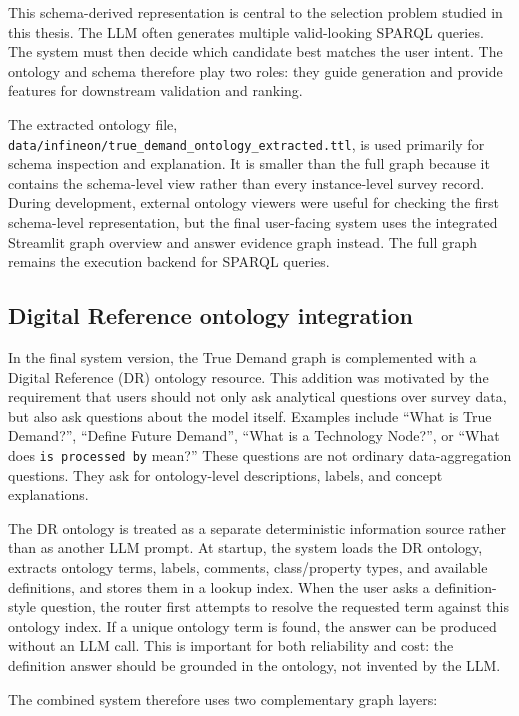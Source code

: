 \documentclass[
  12pt,
  english,
  oneside]{report}
\begin{document}
This schema-derived representation is central to the selection problem studied in this thesis. The LLM often generates multiple valid-looking SPARQL queries. The system must then decide which candidate best matches the user intent. The ontology and schema therefore play two roles: they guide generation and provide features for downstream validation and ranking.

The extracted ontology file, \texttt{data/infineon/true\_demand\_ontology\_extracted.ttl}, is used primarily for schema inspection and explanation. It is smaller than the full graph because it contains the schema-level view rather than every instance-level survey record. During development, external ontology viewers were useful for checking the first schema-level representation, but the final user-facing system uses the integrated Streamlit graph overview and answer evidence graph instead. The full graph remains the execution backend for SPARQL queries.

\subsection{Digital Reference ontology integration}
\label{subsec:digital-reference-ontology}

In the final system version, the True Demand graph is complemented with a Digital Reference (DR) ontology resource. This addition was motivated by the requirement that users should not only ask analytical questions over survey data, but also ask questions about the model itself. Examples include ``What is True Demand?'', ``Define Future Demand'', ``What is a Technology Node?'', or ``What does \texttt{is processed by} mean?'' These questions are not ordinary data-aggregation questions. They ask for ontology-level descriptions, labels, and concept explanations.

The DR ontology is treated as a separate deterministic information source rather than as another LLM prompt. At startup, the system loads the DR ontology, extracts ontology terms, labels, comments, class/property types, and available definitions, and stores them in a lookup index. When the user asks a definition-style question, the router first attempts to resolve the requested term against this ontology index. If a unique ontology term is found, the answer can be produced without an LLM call. This is important for both reliability and cost: the definition answer should be grounded in the ontology, not invented by the LLM.

The combined system therefore uses two complementary graph layers:
\end{document}
